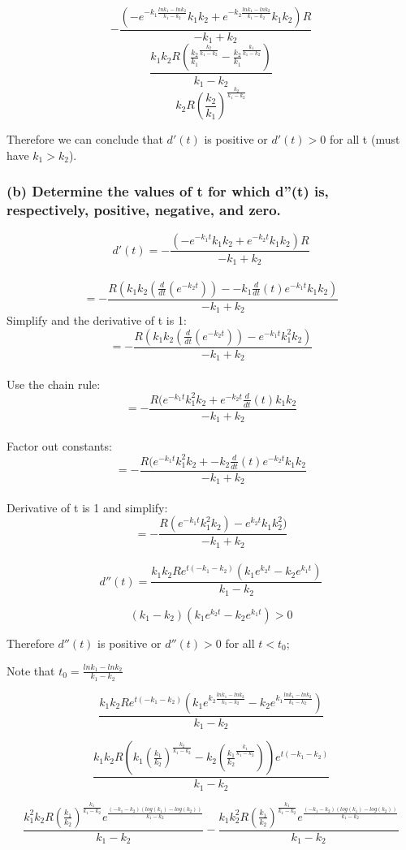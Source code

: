 \documentclass[]{article}
\begin{document}
\[-\frac{(-e^{-k_1 \frac{ln k_1 - ln k_2}{k_1 - k_2}}k_1 k_2 + e^{-k_2 \frac{ln k_1 - ln k_2}{k_1 - k_2}}k_1 k_2)R}{-k_1 + k_2}\]
\[\frac{k_1 k_2 R (\frac{k_2}{k_1}^{\frac{k_2}{k_1 - k_2}}-\frac{k_2}{k_1}^{\frac{k_1}{k_1 - k_2}})}{k_1 - k_2}\]
\[k_2R(\frac{k_2}{k_1})^{\frac{k_2}{k_1 - k_2}}\]

Therefore we can conclude that \(d'(t)\) is positive or \(d'(t) > 0\)
for all t (must have \(k_1 > k_2\)).

\subsubsection{(b) Determine the values of t for which d''(t) is,
respectively, positive, negative, and
zero.}\label{b-determine-the-values-of-t-for-which-dt-is-respectively-positive-negative-and-zero.}

\[d'(t) = -\frac{(-e^{-k_1 t}k_1 k_2 + e^{-k_2 t}k_1 k_2)R}{-k_1 + k_2}\]\\
\[= -\frac{R(k_1 k_2 (\frac{d}{dt}(e^{-k_2 t})) - -k_1 \frac{d}{dt}(t)e^{-k_1 t}k_1 k_2 )}{-k_1 + k_2}\]
Simplify and the derivative of t is 1:
\[= -\frac{R(k_1 k_2 (\frac{d}{dt}(e^{-k_2 t})) - e^{-k_1 t}k_1^2 k_2 )}{-k_1 + k_2}\]\\
Use the chain rule:
\[= -\frac{R(e^{-k_1 t}k_1^2 k_2 + e^{-k_2 t} \frac{d}{dt}(t)k_1 k_2 }{-k_1 + k_2}\]\\
Factor out constants:
\[= -\frac{R(e^{-k_1 t}k_1^2 k_2 + - k_2 \frac{d}{dt}(t) e^{-k_2 t}k_1 k_2} {-k_1 + k_2}\]\\
Derivative of t is 1 and simplify:
\[= - \frac{R (e^{-k_1 t}k_1^2 k_2) - e^{k_2 t} k_1 k_2^2)}{-k_1 + k_2}\]\\
\[d''(t) = \frac{k_1 k_2 R e^{t(-k_1-k_2)}(k_1 e^{k_2 t}-k_2 e^{k_1 t})}{k_1 - k_2}\]

\[(k_1 - k_2)(k_1 e ^{k_2 t}-k_2 e^{k_1 t}) > 0\]

Therefore \(d''(t)\) is positive or \(d''(t) > 0\) for all \(t < t_0\);

Note that \(t_0 = \frac{ln k_1 - ln k_2}{k_1 - k_2}\)

\[\frac{k_1 k_2 R e^{t(-k_1-k_2)}(k_1 e^{k_2 \frac{ln k_1 - ln k_2}{k_1 - k_2}}-k_2 e^{k_1 \frac{ln k_1 - ln k_2}{k_1 - k_2}})}{k_1 - k_2}\]

\[\frac{k_1 k_2 R(k_1 (\frac{k_1}{k_2})^{\frac{k_2}{k_1 - k_2}}-k_2(\frac{k_1}{k_2}^{\frac{k_1}{k_1 - k_2}}))e^{t(-k_1 - k_2)}}{k_1 - k_2}\]

\[\frac{k_1^2 k_2 R (\frac{k_1}{k_2})^{\frac{k_1}{k_1 - k_2}}e^{\frac{(-k_1 - k_2)(log(k_1) - log(k_2))}{k_1 - k_2}}}{k_1 - k_2} - \frac{k_1 k_2^2 R (\frac{k_1}{k_2})^{\frac{k_1}{k_1 - k_2}}e^{\frac{(-k_1 - k_2)(log(k_1) - log(k_2))}{k_1 - k_2}}}{k_1 - k_2}\]
\end{document}
